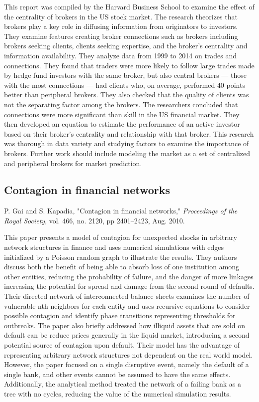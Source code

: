 \documentclass[12pt]{article}
\begin{document}
This report was compiled by the Harvard Business School to examine the effect of the centrality of brokers in the US stock market. The research theorizes that brokers play a key role in diffusing information from originators to investors. They examine features creating broker connections such as brokers including brokers seeking clients, clients seeking expertise, and the broker's centrality and information availability. They analyze data from 1999 to 2014 on trades and connections. They found that traders were more likely to follow large trades made by hedge fund investors with the same broker, but also central brokers — those with the most connections — had clients who, on average, performed 40 points better than peripheral brokers. They also checked that the quality of clients was not the separating factor among the brokers. The researchers concluded that connections were more significant than skill in the US financial market. They then developed an equation to estimate the performance of an active investor based on their broker’s centrality and relationship with that broker. This research was thorough in data variety and studying factors to examine the importance of brokers. Further work should include modeling the market as a set of centralized and peripheral brokers for market prediction.


\subsection{Contagion in financial networks}
P. Gai and S. Kapadia, "Contagion in financial networks," \textit{Proceedings of the Royal Society}, vol. 466, no. 2120, pp 2401–2423, Aug. 2010.
\newline

This paper presents a model of contagion for unexpected shocks in arbitrary network structures in finance and uses numerical simulations with edges initialized by a Poisson random graph to illustrate the results. They authors discuss both the benefit of being able to absorb loss of one institution among other entities, reducing the probability of failure, and the danger of more linkages increasing the potential for spread and damage from the second round of defaults. Their directed network of interconnected balance sheets examines the number of vulnerable nth neighbors for each entity and uses recursive equations to consider possible contagion and identify phase transitions representing thresholds for outbreaks. The paper also briefly addressed how illiquid assets that are sold on default can be reduce prices generally in the liquid market, introducing a second potential source of contagion upon default. Their model has the advantage of representing arbitrary network structures not dependent on the real world model. However, the paper focused on a single disruptive event, namely the default of a single bank, and other events cannot be assumed to have the same effects. Additionally, the analytical method treated the network of a failing bank as a tree with no cycles, reducing the value of the numerical simulation results.
\end{document}

